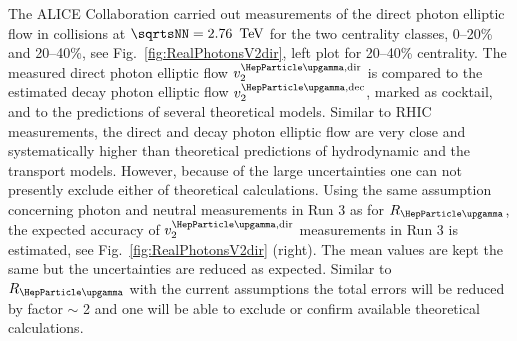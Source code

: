 The ALICE Collaboration carried out measurements of the direct photon elliptic flow \cite{Acharya:2018bdy} in \PbPb{} collisions at $\sqrtsNN=\unit[2.76]{\UTeV}$ for the two centrality classes, 0--20\% and 20--40\%, see Fig.~\ref{fig:RealPhotonsV2dir}, left plot for 20--40\% centrality.
The measured direct photon elliptic flow $v_2^{\PGg,\rm dir}$ is compared to the estimated decay photon elliptic flow $v_2^{\PGg,\rm dec}$, marked as cocktail, and to the predictions of several theoretical models. Similar to RHIC measurements, the direct and decay photon elliptic flow are very close and systematically higher than theoretical predictions of hydrodynamic  \cite{Gale:2014dfa,Chatterjee:2017akg} and the transport  \cite{Linnyk:2015tha} models. However, because of the large uncertainties one can not presently exclude either of theoretical calculations. Using the same assumption concerning photon and neutral measurements in Run 3 as for $R_{\PGg}$, the expected accuracy of $v_2^{\PGg,\rm dir}$ measurements in Run 3 is estimated, see Fig.~\ref{fig:RealPhotonsV2dir} (right). The mean values are kept the same but the uncertainties are reduced as expected. Similar to $R_{\PGg}$ with the current assumptions the total errors will be reduced by factor $\sim$ 2 and one will be able to exclude or confirm available theoretical calculations.





